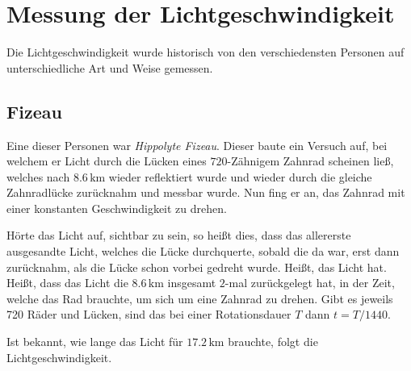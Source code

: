 \documentclass{article}
\begin{document}
\section{Messung der Lichtgeschwindigkeit}
Die Lichtgeschwindigkeit wurde historisch von den verschiedensten Personen auf unterschiedliche Art und Weise gemessen.
 
\subsection{Fizeau} 
Eine dieser Personen war \emph{Hippolyte Fizeau}. Dieser baute ein Versuch auf, bei welchem er Licht durch die Lücken eines $720$-Zähnigem Zahnrad scheinen ließ, welches nach $8.6\,\text{km}$ wieder reflektiert wurde und wieder durch die gleiche Zahnradlücke zurücknahm und messbar wurde. Nun fing er an, das Zahnrad mit einer konstanten Geschwindigkeit zu drehen.
 
Hörte das Licht auf, sichtbar zu sein, so heißt dies, dass das allererste ausgesandte Licht, welches die Lücke durchquerte, sobald die da war, erst dann zurücknahm, als die Lücke schon vorbei gedreht wurde. Heißt, das Licht hat. Heißt, dass das Licht die $8.6\,\text{km}$ insgesamt $2$-mal zurückgelegt hat, in der Zeit, welche das Rad brauchte, um sich um eine Zahnrad zu drehen. Gibt es jeweils 720 Räder und Lücken, sind das bei einer Rotationsdauer $T$ dann $t=T/1440$.
 
Ist bekannt, wie lange das Licht für $17.2\,\text{km}$ brauchte, folgt die Lichtgeschwindigkeit. 
\end{document}

